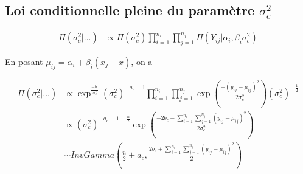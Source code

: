 \documentclass[
]{article}
\begin{document}
\hypertarget{loi-conditionnelle-pleine-du-paramuxe8tre-sigma_c2}{%
\subsection{\texorpdfstring{Loi conditionnelle pleine du paramètre
\(\sigma_{c}^2\)}{Loi conditionnelle pleine du paramètre \textbackslash sigma\_\{c\}\^{}2}}\label{loi-conditionnelle-pleine-du-paramuxe8tre-sigma_c2}}

\begin{align*}
\Pi(\sigma_c^2|...) &\propto \Pi(\sigma_c^2) \prod_{i=1}^{n_i}\prod_{j=1}^{n_j}\Pi(Y_{ij}|\alpha_{i},\beta_{i} \sigma_c^2)
\end{align*}

En posant \(\mu_{ij} = \alpha_i + \beta_i(x_j-\bar{x})\), on a

\begin{align*}
\Pi(\sigma_c^2|...) &\propto \exp^{\frac{-b_c}{\sigma_c^2}}(\sigma_c^2)^{-a_c-1}\prod_{i=1}^{n_i}\prod_{j=1}^{n_j} \exp\left(\frac{-(y_{ij}-\mu_{ij})^{2}}{2\sigma_c^2}\right)(\sigma_c^2)^{-\frac{1}{2}}\\
&\propto (\sigma_c^2)^{-a_c-1-\frac{n}{2}}\exp\left(\frac{-2b_c-\sum\limits_{i=1}^{n_i}\sum\limits_{j=1}^{n_j}(y_{ij}-\mu_{ij})^{2}}{2\sigma_c^2}\right)\\
&\sim InvGamma(\frac{n}{2}+a_c,\frac{2b_c+\sum\limits_{i=1}^{n_i}\sum\limits_{j=1}^{n_j}(y_{ij}-\mu_{ij})^{2}}{2})
\end{align*}
\end{document}
